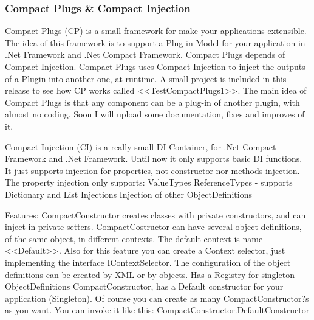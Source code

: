 \subsubsection{Compact Plugs \& Compact Injection}

Compact Plugs (CP) is a small framework for make your applications extensible. The idea of this framework is to support a Plug-in Model for your application in .Net Framework and .Net Compact Framework. Compact Plugs depends of Compact Injection. Compact Plugs uses Compact Injection to inject the outputs of a Plugin into another one, at runtime. A small project is included in this release to see how CP works called <<TestCompactPlugs1>>. The main idea of Compact Plugs is that any component can be a plug-in of another plugin, with almost no coding. Soon I will upload some documentation, fixes and improves of it.

Compact Injection (CI) is a really small DI Container, for .Net Compact Framework and .Net Framework. Until now it only supports basic DI functions. It just supports injection for properties, not constructor nor methods injection. 
The property injection only supports:
ValueTypes
ReferenceTypes - supports Dictionary and List Injections 
Injection of other ObjectDefinitions

Features:
CompactConstructor creates classes with private constructors, and can inject in private setters. 
CompactCostructor can have several object definitions, of the same object, in different contexts. The default context is name <<Default>>. Also for this feature you can create a Context selector, just implementing the interface IContextSelector.
The configuration of the object definitions can be created by XML or by objects. 
Has a Registry for singleton ObjectDefinitions
CompactConstructor, has a Default constructor for your application (Singleton). Of course you can create as many CompactConstructor?s as you want.
You can invoke it like this: CompactConstructor.DefaultConstructor
